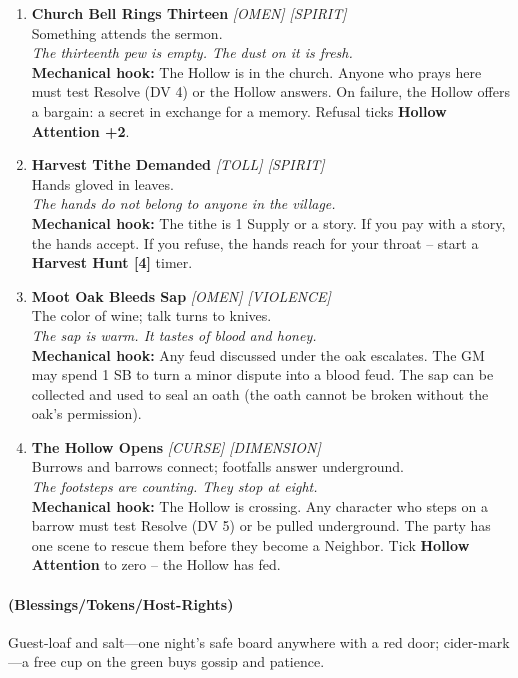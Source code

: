 \begin{enumerate}
\item[J] \textbf{Church Bell Rings Thirteen} \hfill \textit{[OMEN] [SPIRIT]} \\
  Something attends the sermon. \\
  \textit{The thirteenth pew is empty. The dust on it is fresh.} \\
  \textbf{Mechanical hook:} The Hollow is in the church. Anyone who prays here must test Resolve (DV 4) or the Hollow answers. On failure, the Hollow offers a bargain: a secret in exchange for a memory. Refusal ticks \textbf{Hollow Attention +2}.

\item[Q] \textbf{Harvest Tithe Demanded} \hfill \textit{[TOLL] [SPIRIT]} \\
  Hands gloved in leaves. \\
  \textit{The hands do not belong to anyone in the village.} \\
  \textbf{Mechanical hook:} The tithe is 1 Supply or a story. If you pay with a story, the hands accept. If you refuse, the hands reach for your throat -- start a \textbf{Harvest Hunt [4]} timer.

\item[K] \textbf{Moot Oak Bleeds Sap} \hfill \textit{[OMEN] [VIOLENCE]} \\
  The color of wine; talk turns to knives. \\
  \textit{The sap is warm. It tastes of blood and honey.} \\
  \textbf{Mechanical hook:} Any feud discussed under the oak escalates. The GM may spend 1 SB to turn a minor dispute into a blood feud. The sap can be collected and used to seal an oath (the oath cannot be broken without the oak's permission).

\item[A] \textbf{The Hollow Opens} \hfill \textit{[CURSE] [DIMENSION]} \\
  Burrows and barrows connect; footfalls answer underground. \\
  \textit{The footsteps are counting. They stop at eight.} \\
  \textbf{Mechanical hook:} The Hollow is crossing. Any character who steps on a barrow must test Resolve (DV 5) or be pulled underground. The party has one scene to rescue them before they become a Neighbor. Tick \textbf{Hollow Attention} to zero -- the Hollow has fed.
\end{enumerate}

\paragraph*{(Blessings/Tokens/Host-Rights)} Guest-loaf and salt---one night's safe board anywhere with a red door; cider-mark---a free cup on the green buys gossip and patience.

